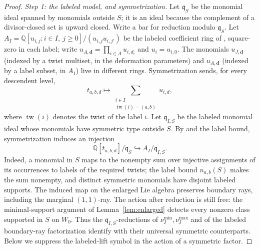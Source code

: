 \documentclass[11pt]{amsart}
\theoremstyle{definition}
\theoremstyle{remark}
\newcommand{\QQ}{\mathbb{Q}}
\begin{document}
\begin{proof}
\emph{Step 1: the labeled model, and symmetrization.}
Let $\mathfrak q_S$ be the monomial ideal spanned by monomials outside $S$;
it is an ideal because the complement of a divisor-closed set is upward
closed.  Write a bar for reduction modulo $\mathfrak q_S$. Let
$A_I=\QQ[u_{i,j}:i\in I,\ j\ge0]/(u_{i,j}u_{i,j'})$ be the labeled
coefficient ring of \cite[Def.~4.6]{GKT}, square-zero in each label; write
$u_{A,\mathbf d}=\prod_{i\in A}u_{i,d_i}$ and $u_{i}=u_{i,0}$. The monomials
$u_{J,\mathbf d}$ (indexed by a twist multiset, in the deformation
parameters) and $u_{A,\mathbf d}$ (indexed by a label subset, in $A_{I}$)
live in different rings.
Symmetrization sends, for every descendent level,
\[
t_{a,b,d}\longmapsto
\sum_{\substack{i\in I\\\operatorname{tw}(i)=(a,b)}}u_{i,d},
\]
where $\operatorname{tw}(i)$ denotes the twist of the label $i$.
Let $\mathfrak q_{I,S}$ be the labeled monomial ideal whose monomials have
symmetric type outside $S$.  By \cite[Lem.~4.14]{GKT} and the label bound,
symmetrization induces an injection
\[
 \QQ[t_{a,b,d}]/\mathfrak q_S\hookrightarrow A_I/\mathfrak q_{I,S}.
\]
Indeed, a monomial in $S$ maps to the nonempty sum over injective assignments
of its occurrences to labels of the required twists; the label bound
$n_{a,b}(S)$ makes the sum nonempty, and distinct symmetric monomials have
disjoint labeled supports. The induced
map on the enlarged Lie algebra preserves boundary rays, including the
marginal $(1,1)$-ray. The action after reduction is still free: the
minimal-support argument of Lemma~\ref{lem:enlarged} detects every nonzero
class supported in $S$ on $W_0$.
Thus the $\mathfrak q_{I,S}$-reductions of $\nu_I^{\min},\nu_I^{\max}$ and of the labeled
boundary-ray factorization identify with their universal symmetric counterparts. Below we
suppress the labeled-lift symbol in the action of a symmetric factor.


\end{proof}
\end{document}
